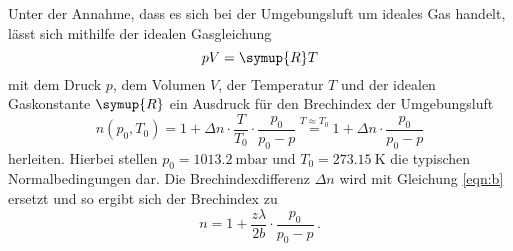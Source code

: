 Unter der Annahme, dass es sich bei der Umgebungsluft um ideales Gas handelt, lässt sich mithilfe der idealen Gasgleichung 
\begin{equation*}
    p V =\symup{R} T
\end{equation*}
mit dem Druck $p$, dem Volumen $V$, der Temperatur $T$ und der idealen Gaskonstante $\symup{R}$ ein Ausdruck 
für den Brechindex der Umgebungsluft 
\begin{equation*}
    n(p_0,T_0)=1+\Delta n \cdot \frac{T}{T_0}\cdot \frac{p_0}{p_0-p} \stackrel{T\approx T_0}{=} 1+\Delta n \cdot \frac{p_0}{p_0-p}
\end{equation*}
herleiten. 
Hierbei stellen $p_0=\SI{1013.2}{\milli\bar}$ und $T_0=\SI{273.15}{\kelvin}$ die typischen Normalbedingungen dar\cite{Versuchsanleitung}. 
Die Brechindexdifferenz $\Delta n$ wird mit Gleichung \eqref{eqn:b} ersetzt und so ergibt sich der Brechindex zu 
\begin{equation}
    n=1+\frac{z\lambda}{2b} \cdot \frac{p_0}{p_0-p} \,.
    \label{eqn:Brechi}
\end{equation}